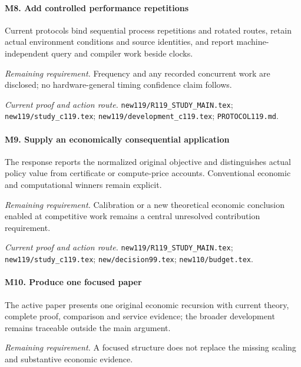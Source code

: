 \paragraph{M8. Add controlled performance repetitions}

Current protocols bind sequential process repetitions and rotated routes, retain actual environment conditions and source identities, and report machine-independent query and compiler work beside clocks.

\par\emph{Remaining requirement.} Frequency and any recorded concurrent work are disclosed; no hardware-general timing confidence claim follows.

\par\emph{Current proof and action route.} \nolinkurl{new119/R119_STUDY_MAIN.tex}; \nolinkurl{new119/study_c119.tex}; \nolinkurl{new119/development_c119.tex}; \nolinkurl{PROTOCOL119.md}.

\paragraph{M9. Supply an economically consequential application}

The response reports the normalized original objective and distinguishes actual policy value from certificate or compute-price accounts. Conventional economic and computational winners remain explicit.

\par\emph{Remaining requirement.} Calibration or a new theoretical economic conclusion enabled at competitive work remains a central unresolved contribution requirement.

\par\emph{Current proof and action route.} \nolinkurl{new119/R119_STUDY_MAIN.tex}; \nolinkurl{new119/study_c119.tex}; \nolinkurl{new/decision99.tex}; \nolinkurl{new110/budget.tex}.

\paragraph{M10. Produce one focused paper}

The active paper presents one original economic recursion with current theory, complete proof, comparison and service evidence; the broader development remains traceable outside the main argument.

\par\emph{Remaining requirement.} A focused structure does not replace the missing scaling and substantive economic evidence.

